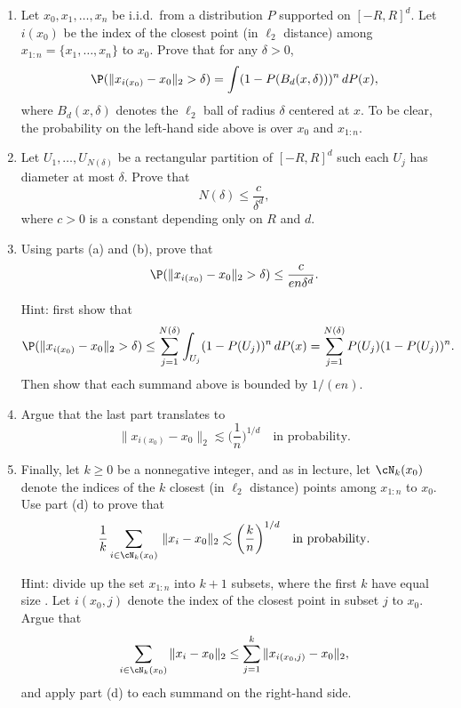\documentclass{article}
\begin{document}
\begin{enumerate}[label=(\alph*)]
\item Let $x_0,x_1,\dots,x_n$ be i.i.d.\ from a distribution $P$ supported on
  $[-R,R]^d$. Let $i(x_0)$ be the index of the closest point (in $\ell_2$
  distance) among $x_{1:n} = \{x_1,\dots,x_n\}$ to $x_0$. Prove that for any
  $\delta > 0$,
  \marginpar{\small [3 pts]}
  \[
  \P( \|x_{i(x_0)} - x_0 \|_2 > \delta ) = \int (1 - P(B_d(x, \delta)))^n \,
  dP(x),
  \]
  where $B_d(x, \delta)$ denotes the $\ell_2$ ball of radius $\delta$
  centered at $x$. To be clear, the probability on the left-hand side above is
  over $x_0$ and $x_{1:n}$.

\item Let $U_1,\dots,U_{N(\delta)}$ be a rectangular partition of $[-R,R]^d$
  such each $U_j$ has diameter at most $\delta$. Prove that 
  \marginpar{\small [2 pts]}
  \[
  N(\delta) \leq \frac{c}{\delta^d},
  \]
  where $c>0$ is a constant depending only on $R$ and $d$. 

\item Using parts (a) and (b), prove that 
  \marginpar{\small [7 pts]}
  \[
  \P( \|x_{i(x_0)} - x_0 \|_2 > \delta ) \leq \frac{c}{e n \delta^d}.
  \]

  Hint: first show that
  \[
  \P( \|x_{i(x_0)} - x_0 \|_2 > \delta ) \leq \sum_{j=1}^{N(\delta)}
  \int_{U_j} (1 - P(U_j))^n \, dP(x) = \sum_{j=1}^{N(\delta)} P(U_j) (1 -
  P(U_j))^n. 
  \]
  Then show that each summand above is bounded by $1/(en)$.

\item Argue that the last part translates to
  \marginpar{\small [1 pts]}
  \[
  \|x_{i(x_0)} - x_0 \|_2 \lesssim \bigg( \frac{1}{n} \bigg)^{1/d} \quad 
  \text{in probability}.
  \]

\item Finally, let $k \geq 0$ be a nonnegative integer, and as in lecture, let  
  $\cN_k(x_0)$ denote the indices of the $k$ closest (in $\ell_2$ distance)
  points among $x_{1:n}$ to $x_0$. Use part (d) to prove that 
  \marginpar{\small [4 pts]}
  \[
  \frac{1}{k} \sum_{i \in \cN_k(x_0)} \, \|x_i - x_0\|_2 \lesssim \bigg(
  \frac{k}{n} \bigg)^{1/d} \quad \text{in probability}. 
  \]

  Hint: divide up the set $x_{1:n}$ into $k+1$ subsets, where the first $k$ have
  equal size . Let $i(x_0, j)$ denote the index of
  the closest point in subset $j$ to $x_0$. Argue that 
  \[
  \sum_{i \in \cN_k(x_0)} \|x_i - x_0\|_2 \leq \sum_{j=1}^k \|x_{i(x_0,j)} -
  x_0\|_2, 
  \]
  and apply part (d) to each summand on the right-hand side. 
 
\end{enumerate}
\end{document}
